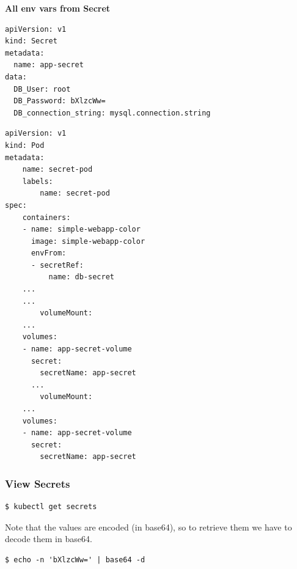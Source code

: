 \documentclass{article}
\newenvironment{blocktemplateIII}[1]{%
    \tcolorbox[beamer,%
    noparskip,breakable,
    ,colframe=Red,%
    colbacklower=LimeGreen!75!LightGreen,%
    title=#1]}%
    {\endtcolorbox}
\newenvironment{codetemplate}[1][]{%
  \mybasecolorbox[#1]
  \itshape
}{%
  \endmybasecolorbox
}
\begin{document}
\textbf{All env vars from Secret}
\begin{codetemplate}{}
\begin{verbatim}
apiVersion: v1
kind: Secret
metadata:
  name: app-secret
data:
  DB_User: root
  DB_Password: bXlzcWw=
  DB_connection_string: mysql.connection.string 
\end{verbatim}
\end{codetemplate}
\begin{codetemplate}{}
\begin{verbatim}
apiVersion: v1
kind: Pod
metadata:
    name: secret-pod
    labels:
        name: secret-pod
spec:
    containers:
    - name: simple-webapp-color
      image: simple-webapp-color
      envFrom:                                                                                                                                            
      - secretRef:                                                                                                                                        
          name: db-secret
    ...
    ...
        volumeMount:
    ...
    volumes:
    - name: app-secret-volume
      secret:
        secretName: app-secret
      ...
        volumeMount:
    ...
    volumes:
    - name: app-secret-volume
      secret:
        secretName: app-secret
\end{verbatim}
\end{codetemplate}

\subsubsection{View Secrets}
\begin{codetemplate}{}
\begin{verbatim}
$ kubectl get secrets
\end{verbatim}
\end{codetemplate}
\begin{blocktemplateIII}{WARNING}
Note that the values are encoded (in base64), so to retrieve them we have to decode them in base64.
\begin{codetemplate}{}
\begin{verbatim}
$ echo -n 'bXlzcWw=' | base64 -d
\end{verbatim}
\end{codetemplate}
\end{blocktemplateIII}
\end{document}
